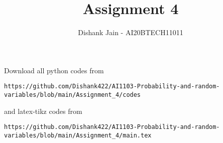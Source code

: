 \documentclass[journal,12pt,twocolumn]{IEEEtran}
\DeclareMathOperator*{\Res}{Res}
\begin{document}
\newcommand{\BEQA}{\begin{eqnarray}}
\newcommand{\EEQA}{\end{eqnarray}}
\newcommand{\define}{\stackrel{\triangle}{=}}

\raggedbottom
\setlength{\parindent}{0pt}
\providecommand{\mbf}{\mathbf}
\providecommand{\pr}[1]{\ensuremath{\Pr\left(#1\right)}}
\providecommand{\qfunc}[1]{\ensuremath{Q\left(#1\right)}}
\providecommand{\sbrak}[1]{\ensuremath{{}\left[#1\right]}}
\providecommand{\lsbrak}[1]{\ensuremath{{}\left[#1\right.}}
\providecommand{\rsbrak}[1]{\ensuremath{{}\left.#1\right]}}
\providecommand{\brak}[1]{\ensuremath{\left(#1\right)}}
\providecommand{\lbrak}[1]{\ensuremath{\left(#1\right.}}
\providecommand{\rbrak}[1]{\ensuremath{\left.#1\right)}}
\providecommand{\cbrak}[1]{\ensuremath{\left\{#1\right\}}}
\providecommand{\lcbrak}[1]{\ensuremath{\left\{#1\right.}}
\providecommand{\rcbrak}[1]{\ensuremath{\left.#1\right\}}}
\theoremstyle{remark}
\newtheorem{rem}{Remark}
\newcommand{\sgn}{\mathop{\mathrm{sgn}}}
\providecommand{\abs}[1]{\vert#1\vert}
\providecommand{\res}[1]{\Res\displaylimits_{#1}} 
\providecommand{\norm}[1]{\lVert#1\rVert}
\providecommand{\mtx}[1]{\mathbf{#1}}
\providecommand{\mean}[1]{E[ #1 ]}
\providecommand{\fourier}{\overset{\mathcal{F}}{ \rightleftharpoons}}
\providecommand{\system}{\overset{\mathcal{H}}{ \longleftrightarrow}}
\newcommand{\solution}{\noindent \textbf{Solution: }}
\newcommand{\cosec}{\,\text{cosec}\,}
\providecommand{\dec}[2]{\ensuremath{\overset{#1}{\underset{#2}{\gtrless}}}}
\newcommand{\myvec}[1]{\ensuremath{\begin{pmatrix}#1\end{pmatrix}}}
\newcommand{\mydet}[1]{\ensuremath{\begin{vmatrix}#1\end{vmatrix}}}
\makeatletter
{}
\makeatother
\let\StandardTheFigure\thefigure
\let\vec\mathbf
\renewcommand{\thefigure}{\theproblem}
\def\putbox#1#2#3{\makebox[0in][l]{\makebox[#1][l]{}\raisebox{\baselineskip}[0in][0in]{\raisebox{#2}[0in][0in]{#3}}}}
     \def\rightbox#1{\makebox[0in][r]{#1}}
     \def\centbox#1{\makebox[0in]{#1}}
     \def\topbox#1{\raisebox{-\baselineskip}[0in][0in]{#1}}
     \def\midbox#1{\raisebox{-0.5\baselineskip}[0in][0in]{#1}}
\vspace{3cm}
\title{Assignment 4}
\author{Dishank Jain - AI20BTECH11011}
\maketitle
\newpage
\bigskip
\renewcommand{\thefigure}{\theenumi}
\renewcommand{\thetable}{\theenumi}
Download all python codes from 
\begin{lstlisting}
https://github.com/Dishank422/AI1103-Probability-and-random-variables/blob/main/Assignment_4/codes
\end{lstlisting}
%
and latex-tikz codes from 
%
\begin{lstlisting}
https://github.com/Dishank422/AI1103-Probability-and-random-variables/blob/main/Assignment_4/main.tex
\end{lstlisting}
\end{document}
